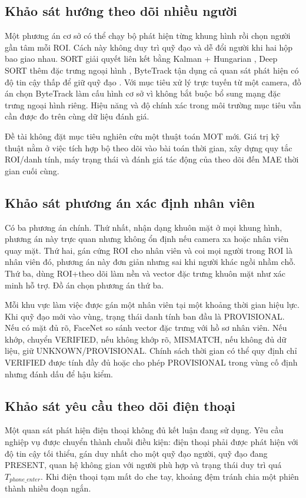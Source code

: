 \subsection{Khảo sát hướng theo dõi nhiều người}
Một phương án cơ sở có thể chạy bộ phát hiện từng khung hình rồi chọn người gần tâm mỗi ROI. Cách này không duy trì quỹ đạo và dễ đổi người khi hai hộp bao giao nhau. SORT giải quyết liên kết bằng Kalman + Hungarian \cite{sort}, Deep SORT thêm đặc trưng ngoại hình \cite{deepsort}, ByteTrack tận dụng cả quan sát phát hiện có độ tin cậy thấp để giữ quỹ đạo \cite{bytetrack}. Với mục tiêu xử lý trực tuyến từ một camera, đồ án chọn ByteTrack làm cấu hình cơ sở vì không bắt buộc bổ sung mạng đặc trưng ngoại hình riêng. Hiệu năng và độ chính xác trong môi trường mục tiêu vẫn cần được đo trên cùng dữ liệu đánh giá.

Đề tài không đặt mục tiêu nghiên cứu một thuật toán MOT mới. Giá trị kỹ thuật nằm ở việc tích hợp bộ theo dõi vào bài toán thời gian, xây dựng quy tắc ROI/danh tính, máy trạng thái và đánh giá tác động của theo dõi đến MAE thời gian cuối cùng.

\subsection{Khảo sát phương án xác định nhân viên}
Có ba phương án chính. Thứ nhất, nhận dạng khuôn mặt ở mọi khung hình, phương án này trực quan nhưng không ổn định nếu camera xa hoặc nhân viên quay mặt. Thứ hai, gán cứng ROI cho nhân viên và coi mọi người trong ROI là nhân viên đó, phương án này đơn giản nhưng sai khi người khác ngồi nhầm chỗ. Thứ ba, dùng ROI+theo dõi làm nền và vector đặc trưng khuôn mặt như xác minh hỗ trợ. Đồ án chọn phương án thứ ba.

Mỗi khu vực làm việc được gán một nhân viên tại một khoảng thời gian hiệu lực. Khi quỹ đạo mới vào vùng, trạng thái danh tính ban đầu là PROVISIONAL. Nếu có mặt đủ rõ, FaceNet so sánh vector đặc trưng với hồ sơ nhân viên. Nếu khớp, chuyển VERIFIED, nếu không khớp rõ, MISMATCH, nếu không đủ dữ liệu, giữ UNKNOWN/PROVISIONAL. Chính sách thời gian có thể quy định chỉ VERIFIED được tính đầy đủ hoặc cho phép PROVISIONAL trong vùng cố định nhưng đánh dấu để hậu kiểm.

\subsection{Khảo sát yêu cầu theo dõi điện thoại}
Một quan sát phát hiện điện thoại không đủ kết luận đang sử dụng. Yêu cầu nghiệp vụ được chuyển thành chuỗi điều kiện: điện thoại phải được phát hiện với độ tin cậy tối thiểu, gán duy nhất cho một quỹ đạo người, quỹ đạo đang PRESENT, quan hệ không gian với người phù hợp và trạng thái duy trì quá $T_{phone\_enter}$. Khi điện thoại tạm mất do che tay, khoảng đệm tránh chia một phiên thành nhiều đoạn ngắn.


